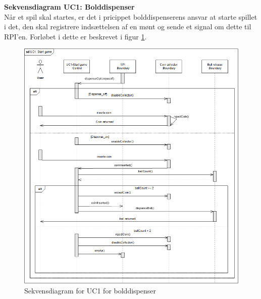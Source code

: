 \documentclass[Arkitektur/System_main.tex]{subfiles}
\begin{document}
\textbf{Sekvensdiagram UC1: Bolddispenser}\\
Når et spil skal startes, er det i pricippet bolddispenserens ansvar at starte spillet i det, den skal registrere indsættelsen af en mønt og sende et signal om dette til RPI'en. Forløbet i dette er beskrevet i figur \ref{fig:seq_uc1_balldispenser}.
\begin{figure}[H]
    \centering
    \includegraphics[width=\textwidth]{Arkitektur/Softwarearkitektur/Applikationsmodel/BallDispenser/graphicsBallDispenser/sdUC1.png}
    \caption{Sekvensdiagram for UC1 for bolddispenser}
    \label{fig:seq_uc1_balldispenser}
\end{figure}
\newpage
\end{document}
